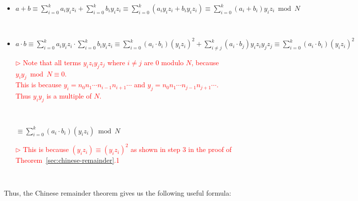 \begin{itemize}
\item $a + b \equiv \sum\limits_{i=0}^k a_i y_i z_i + \sum\limits_{i=0}^k b_i y_i z_i \equiv \sum\limits_{i=0}^k (a_i y_i z_i + b_i y_i z_i) \equiv \sum\limits_{i=0}^k (a_i + b_i) y_i z_i \bmod N $

$ $

\item $a \cdot b \equiv \sum\limits_{i=0}^k a_i y_i z_i \cdot \sum\limits_{i=0}^k b_i y_i z_i \equiv \sum\limits_{i=0}^k (a_i \cdot b_i) (y_i z_i)^2  + \sum\limits_{i\neq j}^k (a_i \cdot b_j) y_i z_iy_j z_j \equiv \sum\limits_{i=0}^k (a_i \cdot b_i) (y_i z_i)^2$

\textcolor{red}{ $\rhd$ Note that all terms $y_iz_iy_jz_j$ where $i \neq j$ are 0 modulo $N$, because $y_iy_j \bmod N \equiv 0$. \\
This is because $y_i = n_0n_1\cdots n_{i-1}n_{i+1}\cdots$ and $y_j = n_0n_1\cdots n_{j-1}n_{j+1}\cdots$. \\
Thus $y_iy_j$ is a multiple of $N$.}

$ $

$\equiv \sum\limits_{i=0}^k (a_i \cdot b_i) (y_i z_i) \bmod N$

\textcolor{red}{ $\rhd$ This is because $(y_i z_i) \equiv (y_i z_i)^2$ as shown in step 3 in the proof of Theorem~\ref*{sec:chinese-remainder}.1}


\end{itemize}

$ $

Thus, the Chinese remainder theorem gives us the following useful formula: 

